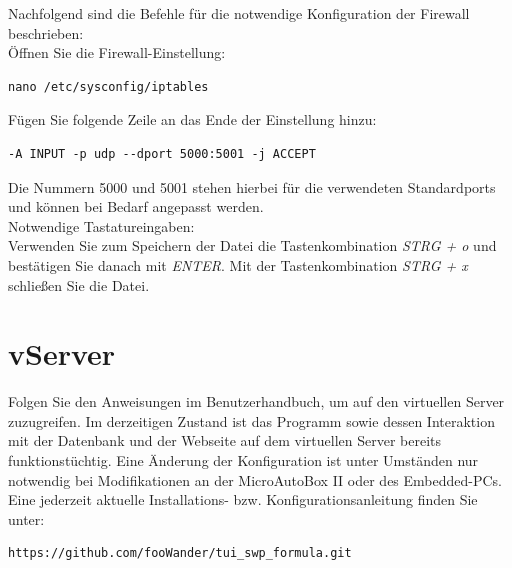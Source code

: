 \documentclass[fontsize = 12pt, paper = a4]{scrreprt}
\begin{document}
Nachfolgend sind die Befehle für die notwendige Konfiguration der Firewall beschrieben: \\
Öffnen Sie die Firewall-Einstellung:

\vspace*{4mm}
\begin{lstlisting}[frame=single]
nano /etc/sysconfig/iptables
\end{lstlisting} 
\vspace*{-2mm}

Fügen Sie folgende Zeile an das Ende der Einstellung hinzu:

\vspace*{4mm}
\begin{lstlisting}[frame=single]
-A INPUT -p udp --dport 5000:5001 -j ACCEPT
\end{lstlisting} 
\vspace*{-2mm}

Die Nummern 5000 und 5001 stehen hierbei für die verwendeten Standardports und können bei Bedarf angepasst werden.\\

Notwendige Tastatureingaben: \\

Verwenden Sie zum Speichern der Datei die Tastenkombination \textit{STRG + o} und bestätigen Sie danach mit \textit{ENTER}. Mit der Tastenkombination \textit{STRG + x} schließen Sie die Datei. 




\section{vServer}


Folgen Sie den Anweisungen im Benutzerhandbuch, um auf den virtuellen Server zuzugreifen. Im derzeitigen Zustand ist das Programm sowie dessen Interaktion mit der Datenbank und der Webseite auf dem virtuellen Server bereits funktionstüchtig. Eine Änderung der Konfiguration ist unter Umständen nur notwendig bei Modifikationen an der MicroAutoBox II oder des Embedded-PCs. Eine jederzeit aktuelle Installations- bzw. Konfigurationsanleitung finden Sie unter:

\vspace*{4mm}
\begin{lstlisting}[frame=single]
https://github.com/fooWander/tui_swp_formula.git
\end{lstlisting} 
\vspace*{-2mm}
\end{document}
